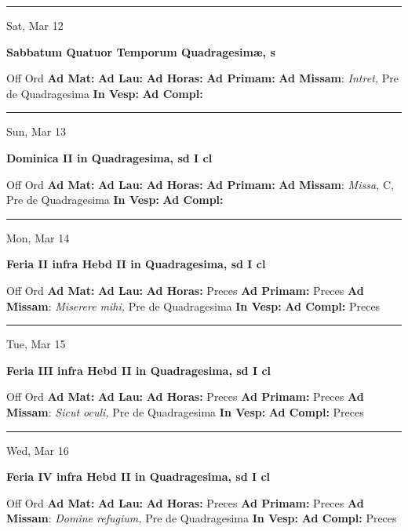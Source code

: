 \documentclass[letterpaper, 10pt]{article}
\begin{document}
\hrule
\begin{center}
Sat, Mar 12
\end{center}\textbf{ \large Sabbatum Quatuor Temporum Quadragesimæ, \textnormal{\normalsize s}}
\begin{justify}
Off Ord
\textbf{Ad Mat: }
\textbf{Ad Lau: }
\textbf{Ad Horas: }
\textbf{Ad Primam: }
\textbf{Ad Missam}: \textit{Intret,} Pre de Quadragesima
\textbf{In Vesp: }
\textbf{Ad Compl: }\end{justify}



\hrule
\begin{center}
Sun, Mar 13
\end{center}\textbf{ \large Dominica II in Quadragesima, \textnormal{\normalsize sd I cl}}
\begin{justify}
Off Ord
\textbf{Ad Mat: }
\textbf{Ad Lau: }
\textbf{Ad Horas: }
\textbf{Ad Primam: }
\textbf{Ad Missam}: \textit{Missa,} C, Pre de Quadragesima
\textbf{In Vesp: }
\textbf{Ad Compl: }\end{justify}



\hrule
\begin{center}
Mon, Mar 14
\end{center}\textbf{ \large Feria II infra Hebd II in Quadragesima, \textnormal{\normalsize sd I cl}}
\begin{justify}
Off Ord
\textbf{Ad Mat: }
\textbf{Ad Lau: }
\textbf{Ad Horas: }Preces
\textbf{Ad Primam: }Preces
\textbf{Ad Missam}: \textit{Miserere mihi,} Pre de Quadragesima
\textbf{In Vesp: }
\textbf{Ad Compl: }Preces\end{justify}



\hrule
\begin{center}
Tue, Mar 15
\end{center}\textbf{ \large Feria III infra Hebd II in Quadragesima, \textnormal{\normalsize sd I cl}}
\begin{justify}
Off Ord
\textbf{Ad Mat: }
\textbf{Ad Lau: }
\textbf{Ad Horas: }Preces
\textbf{Ad Primam: }Preces
\textbf{Ad Missam}: \textit{Sicut oculi,} Pre de Quadragesima
\textbf{In Vesp: }
\textbf{Ad Compl: }Preces\end{justify}



\hrule
\begin{center}
Wed, Mar 16
\end{center}\textbf{ \large Feria IV infra Hebd II in Quadragesima, \textnormal{\normalsize sd I cl}}
\begin{justify}
Off Ord
\textbf{Ad Mat: }
\textbf{Ad Lau: }
\textbf{Ad Horas: }Preces
\textbf{Ad Primam: }Preces
\textbf{Ad Missam}: \textit{Domine refugium,} Pre de Quadragesima
\textbf{In Vesp: }
\textbf{Ad Compl: }Preces\end{justify}
\end{document}

